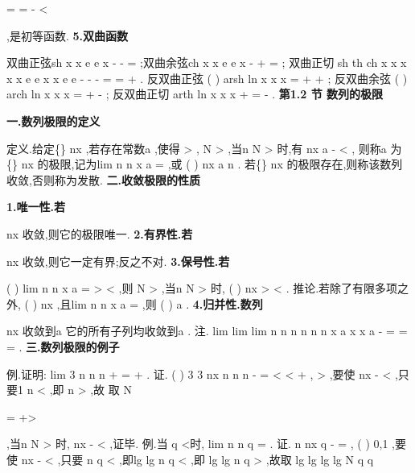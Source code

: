 =
=
-
<

,是初等函数. 
{\bfseries \textcolor{lyred}{5.双曲函数}}

\textcolor{lyred}{双曲正弦}sh
x
x
e
e
x
-
-
=
;\textcolor{lyred}{双曲余弦}ch
x
x
e
e
x
-
+
=
; 
\textcolor{lyred}{双曲正切}
sh
th
ch
x
x
x
x
x
e
e
x
x
e
e
-
-
-
=
=
+
. 
\textcolor{lyred}{反双曲正弦}
(
)
arsh
ln
x
x
x
=
+
+
; 
\textcolor{lyred}{反双曲余弦}
(
)
arch
ln
x
x
x
=
+
-
; 
\textcolor{lyred}{反双曲正切}
arth
ln
x
x
x
+
=
-
. 
\vspace{6pt}
{\large \bfseries \textcolor{lyred}{第1.2 节 数列的极限}}

\vspace{4pt}
{\bfseries \textcolor{lyred}{一.数列极限的定义}}

\textcolor{lyred}{定义}.给定\{\}
nx
,若存在常数a ,使得
\varepsilon 
\forall 
>
,
N
\exists 
>
,当n
N
>
时,有
nx
a
\varepsilon 
-
<
, 
则称a 为\{\}
nx
的\textcolor{lyred}{极限},记为lim
n
n
x
a
\to \infty 
=
,或
(
)
nx
a n
\to 
\to \infty . 
若\{\}
nx
的极限存在,则称该数列\textcolor{lyred}{收敛},否则称为\textcolor{lyred}{发散}. 
\vspace{4pt}
{\bfseries \textcolor{lyred}{二.收敛极限的性质}}

{\bfseries \textcolor{lyred}{1.唯一性.若}}

nx
收敛,则它的极限唯一. 
{\bfseries \textcolor{lyred}{2.有界性.若}}

nx
收敛,则它一定有界;反之不对. 
{\bfseries \textcolor{lyred}{3.保号性.若}}

(
)
lim
n
n
x
a
\to \infty 
=
>
<
,则
N
\exists 
>
,当n
N
>
时,
(
)
nx >
<
. 
\textcolor{lyred}{推论}.若除了有限多项之外,
(
)
nx \ge 
\le 
,且lim
n
n
x
a
\to \infty 
=
,则
(
)
a \ge 
\le 
. 
{\bfseries \textcolor{lyred}{4.归并性.数列}}

nx
收敛到a \Leftrightarrow 它的所有子列均收敛到a . 
\textcolor{lyred}{注}.
lim
lim
lim
n
n
n
n
n
n
x
a
x
x
a
-
\to \infty 
\to \infty 
\to \infty 
=
\Leftrightarrow 
=
=
. 
\vspace{4pt}
{\bfseries \textcolor{lyred}{三.数列极限的例子}}

\textcolor{lyred}{例}.证明:
lim 3
n
n
n
\to \infty 
+
=
+
. 
证.
(
)
3 3
nx
n
n
n
-
=
<
<
+
,
\varepsilon 
\forall 
>
,要使
nx
\varepsilon 
-
<
,只要1
n
\varepsilon 
<
,即
n
\varepsilon 
>
,故 
取
N
\varepsilon 
\varepsilon 

=
+>


,当n
N
>
时,
nx
\varepsilon 
-
<
,证毕. 
\textcolor{lyred}{例}.当
q <时, lim
n
n
q
\to \infty 
=
. 
证.
n
nx
q
-
=
,
(
)
0,1
\varepsilon 
\forall \in 
,要使
nx
\varepsilon 
-
<
,只要
n
q
\varepsilon 
<
,即lg
lg
n
q
\varepsilon 
<
,即 
lg
lg
n
q
\varepsilon 
>
,故取
lg
lg
lg
lg
N
q
q
\varepsilon 
\varepsilon 


